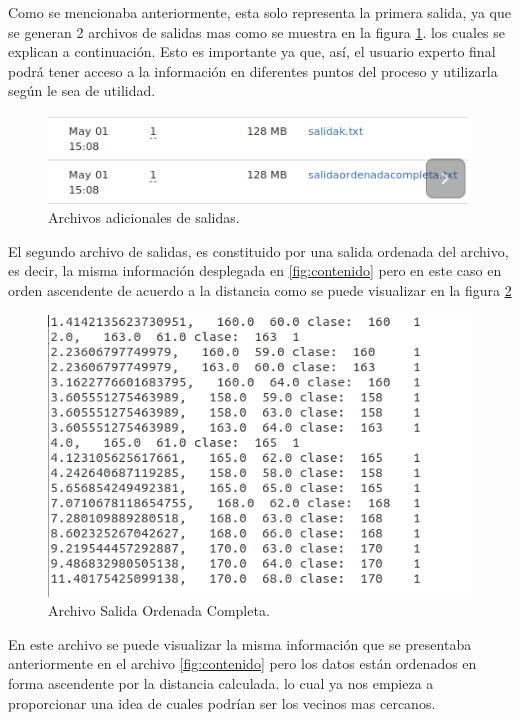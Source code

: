 Como se mencionaba anteriormente, esta solo representa la primera salida, ya que se generan 2 archivos de salidas mas como se muestra en la figura \ref{fig:archivos}. los cuales se explican a continuación. Esto es importante ya que, así, el usuario experto final podrá tener acceso a la información en diferentes puntos del proceso y utilizarla según le sea de utilidad.
\begin{figure}[H]
	\begin{center}
		\hypertarget{fig:archivos}{\hspace{1pt}}
		\includegraphics[width=.7\textwidth]{capitulo4a/images/corrida6.png}
		\caption{Archivos adicionales de salidas.}
		\label{fig:archivos}
	\end{center}
\end{figure}
El segundo archivo de salidas, es constituido por una salida ordenada del archivo, es decir, la misma información desplegada en \ref{fig:contenido} pero en este caso en orden ascendente de acuerdo a la distancia como se puede visualizar en la figura \ref{fig:ordenado}
\begin{figure}[H]
	\begin{center}
		\hypertarget{fig:ordenado}{\hspace{1pt}}
		\includegraphics[width=.7\textwidth]{capitulo4a/images/ordenadacompleta.png}
		\caption{Archivo Salida Ordenada Completa.}
		\label{fig:ordenado}
	\end{center}
\end{figure}
En este archivo se puede visualizar la misma información que se presentaba anteriormente en el archivo \ref{fig:contenido} pero los datos están ordenados en forma ascendente por la distancia calculada. lo cual ya nos empieza a proporcionar una idea de cuales podrían ser los vecinos mas cercanos. \\
